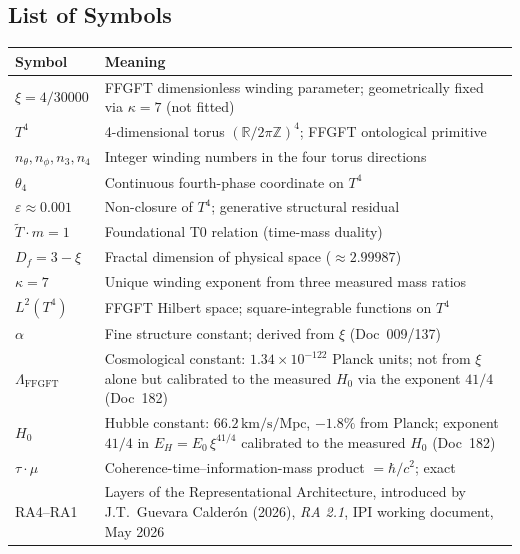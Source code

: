 
\subsection*{List of Symbols}

{\small
\begin{tabular}{p{3.2cm}p{10.5cm}}
\toprule
\textbf{Symbol} & \textbf{Meaning} \\
\midrule
$\xi = 4/30000$ & FFGFT dimensionless winding parameter; geometrically fixed via $\kappa=7$ (not fitted) \\
$T^4$ & 4-dimensional torus $(\mathbb{R}/2\pi\mathbb{Z})^4$; FFGFT ontological primitive \\
$n_\theta, n_\phi, n_3, n_4$ & Integer winding numbers in the four torus directions \\
$\theta_4$ & Continuous fourth-phase coordinate on $T^4$ \\
$\varepsilon \approx 0.001$ & Non-closure of $T^4$; generative structural residual \\
$\tilde{T}\cdot m = 1$ & Foundational T0 relation (time-mass duality) \\
$D_f = 3 - \xi$ & Fractal dimension of physical space ($\approx 2.99987$) \\
$\kappa = 7$ & Unique winding exponent from three measured mass ratios \\
$L^2(T^4)$ & FFGFT Hilbert space; square-integrable functions on $T^4$ \\
$\alpha$ & Fine structure constant; derived from $\xi$ (Doc~009/137) \\
$\Lambda_\text{FFGFT}$ & Cosmological constant: $1.34\times10^{-122}$ Planck units; not from $\xi$ alone but calibrated to the measured $H_0$ via the exponent $41/4$ (Doc~182) \\
$H_0$ & Hubble constant: $66.2\,\text{km/s/Mpc}$, $-1.8\%$ from Planck; exponent $41/4$ in $E_H = E_0\,\xi^{41/4}$ calibrated to the measured $H_0$ (Doc~182) \\
$\tau\cdot\mu$ & Coherence-time--information-mass product $= \hbar/c^2$; exact \\
RA4--RA1 & Layers of the Representational Architecture, introduced by J.T.~Guevara Calderón (2026), \textit{RA 2.1}, IPI working document, May 2026 \\
\bottomrule
\end{tabular}
}

